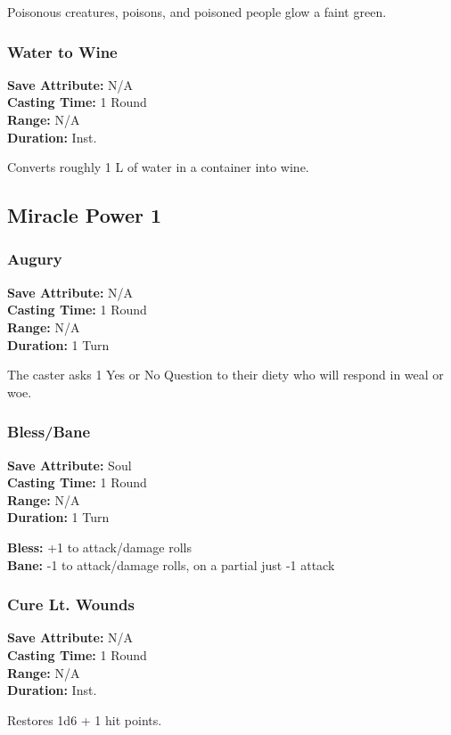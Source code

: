 \begin{multicols}{2}
Poisonous creatures, poisons, and poisoned people glow a faint green.

\subsubsection*{Water to Wine}
\begin{mercClassInfo}
\textbf{Save Attribute:} N/A\\
\textbf{Casting Time:} 1 Round\\
\textbf{Range:} N/A\\
\textbf{Duration:} Inst.
\end{mercClassInfo}

Converts roughly 1 L of water in a container into wine.

\subsection*{Miracle Power 1}

\subsubsection*{Augury}
\begin{mercClassInfo}
\textbf{Save Attribute:} N/A\\
\textbf{Casting Time:} 1 Round\\
\textbf{Range:} N/A\\
\textbf{Duration:} 1 Turn
\end{mercClassInfo}

The caster asks 1 Yes or No Question to their diety who will respond in weal or woe.

\subsubsection*{Bless/Bane}
\begin{mercClassInfo}
\textbf{Save Attribute:} Soul\\
\textbf{Casting Time:} 1 Round\\
\textbf{Range:} N/A\\
\textbf{Duration:} 1 Turn
\end{mercClassInfo}

\textbf{Bless:} +1 to attack/damage rolls \\
\textbf{Bane:} -1 to attack/damage rolls, on a partial just -1 attack
\subsubsection*{Cure Lt. Wounds}
\begin{mercClassInfo}
\textbf{Save Attribute:} N/A\\
\textbf{Casting Time:} 1 Round\\
\textbf{Range:} N/A\\
\textbf{Duration:} Inst.
\end{mercClassInfo}

Restores 1d6 + 1 hit points.

\end{multicols}